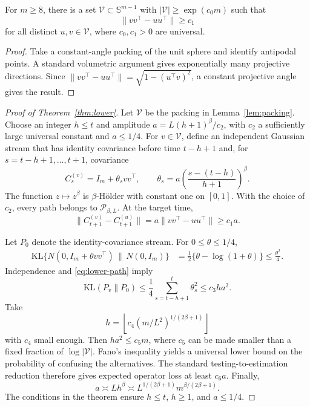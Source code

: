 \begin{lemma}
\label{lem:packing}
For $m\ge8$, there is a set $\mathcal V\subset\mathbb S^{m-1}$ with
$|\mathcal V|\ge\exp(c_0m)$ such that
\begin{equation}
 \|vv^\top-uu^\top\|\ge c_1
\end{equation}
for all distinct $u,v\in\mathcal V$, where $c_0,c_1>0$ are universal.
\end{lemma}

\begin{proof}
Take a constant-angle packing of the unit sphere and identify antipodal points.  A standard volumetric argument gives exponentially many projective directions.  Since
$\|vv^\top-uu^\top\|=\sqrt{1-(u^\top v)^2}$, a constant projective angle gives the result.
\end{proof}

\begin{proof}[Proof of Theorem~\ref{thm:lower}]
Let $\mathcal V$ be the packing in Lemma~\ref{lem:packing}.  Choose an integer $h\le t$ and amplitude $a=L(h+1)^\beta/c_2$, with $c_2$ a sufficiently large universal constant and $a\le1/4$.  For $v\in\mathcal V$, define an independent Gaussian stream that has identity covariance before time $t-h+1$ and, for $s=t-h+1,\ldots,t+1$, covariance
\begin{equation}
 C_s^{(v)}=I_m+\theta_svv^\top,\qquad
 \theta_s=a\left(\frac{s-(t-h)}{h+1}\right)^\beta.
 \label{eq:lower-path}
\end{equation}
The function $z\mapsto z^\beta$ is $\beta$-H\"older with constant one on $[0,1]$.  With the choice of $c_2$, every path belongs to $\mathcal P_{\beta,L}$.  At the target time,
\begin{equation}
 \|C_{t+1}^{(v)}-C_{t+1}^{(u)}\|
 =a\|vv^\top-uu^\top\|\ge c_1a.
\end{equation}

Let $P_0$ denote the identity-covariance stream.  For $0\le\theta\le1/4$,
\begin{align}
 \mathrm{KL}\{N(0,I_m+\theta vv^\top)\,\|\,N(0,I_m)\}
 &=\frac12\{\theta-\log(1+\theta)\}
 \le\frac{\theta^2}{4}.
\end{align}
Independence and \eqref{eq:lower-path} imply
\begin{equation}
 \mathrm{KL}(P_v\|P_0)
 \le\frac14\sum_{s=t-h+1}^{t}\theta_s^2
 \le c_3ha^2.
\end{equation}
Take
\begin{equation}
 h=\left\lfloor c_4(m/L^2)^{1/(2\beta+1)}\right\rfloor
\end{equation}
with $c_4$ small enough.  Then $ha^2\le c_5m$, where $c_5$ can be made smaller than a fixed fraction of $\log|\mathcal V|$.  Fano's inequality yields a universal lower bound on the probability of confusing the alternatives.  The standard testing-to-estimation reduction therefore gives expected operator loss at least $c_6a$.  Finally,
\begin{equation}
 a\asymp Lh^\beta
 \asymp L^{1/(2\beta+1)}m^{\beta/(2\beta+1)}.
\end{equation}
The conditions in the theorem ensure $h\le t$, $h\ge1$, and $a\le1/4$.
\end{proof}

